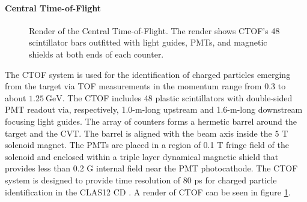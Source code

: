 \paragraph{Central Time-of-Flight}
    \begin{figure}
        \centering{}
        \caption[Central Time-of-Flight]{Render of the Central Time-of-Flight.
        The render shows CTOF's 48 scintillator bars outfitted with light guides, PMTs, and magnetic shields at both ends of each counter.}
        \label{fig::ctof}
    \end{figure}

    The CTOF system is used for the identification of charged particles emerging from the target via TOF measurements in the momentum range from $0.3$ to about $1.25 ~\text{GeV}$.
    The CTOF includes 48 plastic scintillators with double-sided PMT readout via, respectively, 1.0-m-long upstream and 1.6-m-long downstream focusing light guides.
    The array of counters forms a hermetic barrel around the target and the CVT.
    The barrel is aligned with the beam axis inside the 5 T solenoid magnet.
    The PMTs are placed in a region of 0.1 T fringe field of the solenoid and enclosed within a triple layer dynamical magnetic shield that provides less than 0.2 G internal field near the PMT photocathode.
    The CTOF system is designed to provide time resolution of 80 ps for charged particle identification in the CLAS12 CD \cite{carman2020ctof}.
    A render of CTOF can be seen in figure \ref{fig::ctof}.

